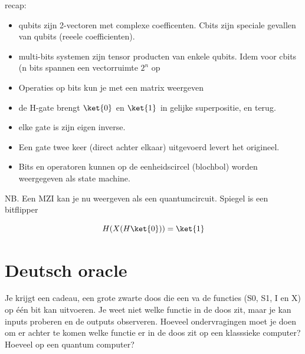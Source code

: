 
recap:
\begin{itemize}[nosep]
\item  qubits zijn 2-vectoren met complexe coefficenten. Cbits zijn speciale gevallen van qubits (reeele coefficienten).
\item multi-bits systemen zijn tensor producten van enkele qubits. Idem voor cbits (n bits spannen een vectorruimte $2^n$ op 
\item Operaties op bits kun je met een matrix weergeven
\item de H-gate brengt $\ket{0}$
en $\ket{1}$ in gelijke superpositie, en terug.
\item elke gate is zijn eigen inverse.
\item Een gate twee keer (direct achter elkaar) uitgevoerd levert het origineel. 
\item Bits en operatoren kunnen op de eenheidscircel (blochbol) worden weergegeven als state machine.
\end{itemize}

NB. Een MZI kan je nu weergeven als een quantumcircuit. Spiegel is een bitflipper

$$H(X(H\ket{0}))=\ket{1}$$

\section*{Deutsch oracle}
Je krijgt een cadeau, een grote zwarte doos die een va de functies (S0, S1, I en X)  op \'e\'en bit kan uitvoeren. Je weet niet welke functie in de doos zit, maar je kan inputs proberen en de outputs observeren. Hoeveel ondervragingen moet je doen om er achter te komen welke functie er in de doos zit op een klasssieke computer? Hoeveel op een quantum computer?

